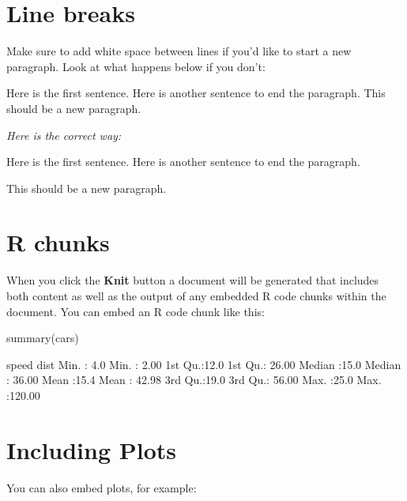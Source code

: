 \documentclass[12pt,twoside]{reedthesis}
\begin{document}
  \section{Line breaks}\label{line-breaks}
  
  Make sure to add white space between lines if you'd like to start a new
  paragraph. Look at what happens below if you don't:
  
  Here is the first sentence. Here is another sentence to end the
  paragraph. This should be a new paragraph.
  
  \emph{Here is the correct way:}
  
  Here is the first sentence. Here is another sentence to end the
  paragraph.
  
  This should be a new paragraph.
  
  \section{R chunks}\label{r-chunks}
  
  When you click the \textbf{Knit} button a document will be generated
  that includes both content as well as the output of any embedded R code
  chunks within the document. You can embed an R code chunk like this:
  
  \begin{CodeChunk}
  \begin{CodeInput}
  summary(cars)
  \end{CodeInput}
  \begin{CodeOutput}
       speed           dist       
   Min.   : 4.0   Min.   :  2.00  
   1st Qu.:12.0   1st Qu.: 26.00  
   Median :15.0   Median : 36.00  
   Mean   :15.4   Mean   : 42.98  
   3rd Qu.:19.0   3rd Qu.: 56.00  
   Max.   :25.0   Max.   :120.00  
  \end{CodeOutput}
  \end{CodeChunk}
  
  \section{Including Plots}\label{including-plots}
  
  You can also embed plots, for example:
  
\end{document}

